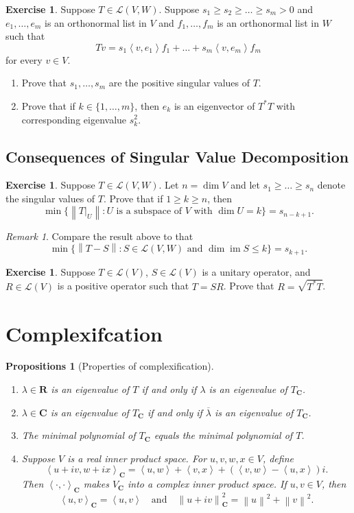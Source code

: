 \documentclass[nofonts,colorlinks]{tufte-handout}
\theoremstyle{plain} %
\newtheorem{props}[thm]{Propositions}
\theoremstyle{definition}
\newtheorem{exer}[thm]{Exercise}
\theoremstyle{remark}
\newtheorem{rmk}[thm]{Remark}
\newcommand{\norm}[1]{\mathopen{}\left\lVert#1\right\rVert}
\newcommand{\inp}[2]{\mathopen{}\left\langle#1,#2\right\rangle}
\newcommand{\rest}[2]{\mathopen{}\left.#1\right|_{#2}}
\newcommand{\R}{\mathbf{R}}
\newcommand{\C}{\mathbf{C}}
\renewcommand{\L}{\mathcal{L}}
\DeclareMathOperator{\im}{im}
\begin{document}
\begin{exer}
	Suppose $T\in\L(V,W)$. Suppose $s_1\geq s_2\geq\dots\geq s_m>0$ and $e_1,\dots,e_m$ is an orthonormal list in $V$ and $f_1,\dots,f_m$ is an orthonormal list in $W$ such that
	\[Tv=s_1\inp{v}{e_1}f_1+\dots+s_m\inp{v}{e_m}f_m\]
	for every $v\in V$.
	\begin{enumerate}
		\item Prove that $s_1,\dots,s_m$ are the positive singular values of $T$.
		\item Prove that if $k\in\{1,\dots,m\}$, then $e_k$ is an eigenvector of $T^*T$ with corresponding eigenvalue $s_k^2$.
	\end{enumerate}
\end{exer}


\subsection{Consequences of Singular Value Decomposition}
\begin{exer}
	Suppose $T\in\L(V,W)$. Let $n=\dim V$ and let $s_1\geq\dots\geq s_n$ denote the singular values of $T$. Prove that if $1\geq k\geq n$, then
	\[\min\{\norm{\rest{T}{U}}:U\text{ is a subspace of $V$ with $\dim U=k$}\}=s_{n-k+1}.\]
\end{exer}
\begin{rmk}
	Compare the result above to that
	\[\min\{\norm{T-S}:S\in\L(V,W)\text{ and $\dim\im S\leq k$}\}=s_{k+1}.\]
\end{rmk}

\begin{exer}
	Suppose $T\in\L(V)$, $S\in\L(V)$ is a unitary operator, and $R\in\L(V)$ is a positive operator such that $T=SR$. Prove that $R=\sqrt{T^*T}$.
\end{exer}


\section{Complexifcation}
\begin{props}[Properties of complexification]
	\begin{enumerate}
		\item $\lambda\in\R$ is an eigenvalue of $T$ if and only if $\lambda$ is an eigenvalue of $T_{\C}$.
		\item $\lambda\in\C$ is an eigenvalue of $T_{\C}$ if and only if $\overline{\lambda}$ is an eigenvalue of $T_{\C}$.
		\item The minimal polynomial of $T_{\C}$ equals the minimal polynomial of $T$.
		\item Suppose $V$ is a real inner product space. For $u,v,w,x\in V$, define
		\[\inp{u+iv}{w+ix}_{\C}=\inp{u}{w}+\inp{v}{x}+(\inp{v}{w}-\inp{u}{x})i.\]
		Then $\inp{\cdot}{\cdot}_{\C}$ makes $V_{\C}$ into a complex inner product space. If $u,v\in V$, then
		\[\inp{u}{v}_{\C}=\inp{u}{v}\quad\text{and}\quad\norm{u+iv}_{\C}^2=\norm{u}^2+\norm{v}^2.\]
	\end{enumerate}
\end{props}
\end{document}
